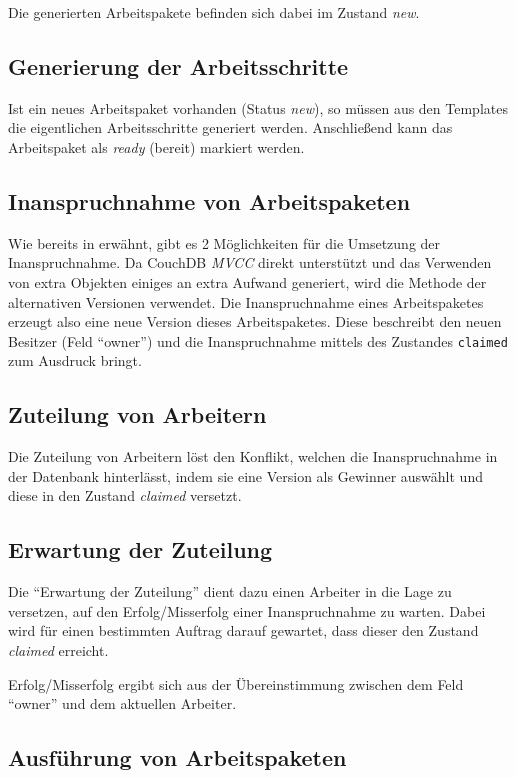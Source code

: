 Die generierten Arbeitspakete befinden sich dabei im Zustand \textit{new}.

\subsection{Generierung der Arbeitsschritte}

Ist ein neues Arbeitspaket vorhanden (Status \textit{new}), so müssen aus den Templates die eigentlichen Arbeitsschritte generiert werden.
Anschließend kann das Arbeitspaket als \textit{ready} (bereit) markiert werden.

\subsection{Inanspruchnahme von Arbeitspaketen}

Wie bereits in  erwähnt,
gibt es 2 Möglichkeiten für die Umsetzung der Inanspruchnahme.
Da CouchDB \emph{MVCC} direkt unterstützt und das Verwenden von extra Objekten einiges an extra Aufwand generiert, wird die Methode der alternativen Versionen verwendet.
Die Inanspruchnahme eines Arbeitspaketes erzeugt also eine neue Version dieses Arbeitspaketes.
Diese beschreibt den neuen Besitzer (Feld ``owner'') und die Inanspruchnahme mittels des Zustandes \verb|claimed|
zum Ausdruck bringt.

\subsection{Zuteilung von Arbeitern}
Die Zuteilung von Arbeitern löst den Konflikt,
welchen die Inanspruchnahme in der Datenbank hinterlässt,
indem sie eine Version als Gewinner auswählt und
diese in den Zustand \textit{claimed} versetzt.

\subsection{Erwartung der Zuteilung}

Die ``Erwartung der Zuteilung'' dient dazu
einen Arbeiter in die Lage zu versetzen,
auf den Erfolg/Misserfolg einer Inanspruchnahme zu warten.
Dabei wird für einen bestimmten Auftrag darauf gewartet,
dass dieser den Zustand \textit{claimed} erreicht.

Erfolg/Misserfolg ergibt sich aus der Übereinstimmung zwischen dem Feld ``owner'' und dem aktuellen Arbeiter.

\subsection{Ausführung von Arbeitspaketen}

